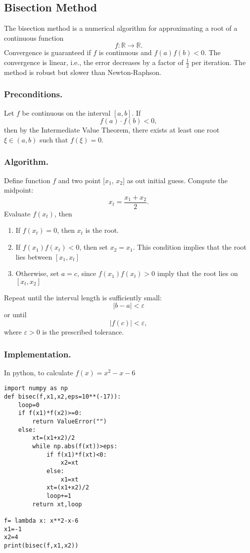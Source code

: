 \documentclass[../../../main.tex]{subfiles}
\begin{document}
\subsection{Bisection Method}

The bisection method is a numerical algorithm for approximating a root of a continuous function
\[
    f : \mathbb{R} \to \mathbb{R}.
\]
Convergence is guaranteed if $f$ is continuous and $f(a)f(b)<0$.
The convergence is linear, i.e., the error decreases by a factor of $\tfrac{1}{2}$ per iteration.
The method is robust but slower than Newton-Raphson.

\subsubsection{Preconditions.}
Let $f$ be continuous on the interval $[a,b]$.
If
\[
    f(a) \cdot f(b) < 0,
\]
then by the Intermediate Value Theorem, there exists at least one root $\xi \in (a,b)$ such that $f(\xi) = 0$.

\subsubsection{Algorithm.}
Define function $f$ and two point $[x_1$, $x_2]$ as out initial guess.
Compute the midpoint:
\[
    x_t= \frac{x_1+x_2}{2}.
\]
Evaluate $f(x_t)$, then
\begin{enumerate}
    \item If $f(x_t) = 0$, then $x_t$ is the root.
    \item If $f(x_1) f(x_t) < 0$, then set $x_2 = x_1$. This condition implies that the root lies between $[x_1,x_t]$
    \item Otherwise, set $a = c$, since $f(x_1)f(x_t)>0$ imply that the root lies on $[x_t,x_2]$
\end{enumerate}
Repeat until the interval length is sufficiently small:
\[
    |b-a| < \varepsilon
\]
or until
\[
    |f(c)| < \varepsilon,
\]
where $\varepsilon > 0$ is the prescribed tolerance.

\subsubsection{Implementation.}
In python, to calculate $f(x)=x^2-x-6$
\begin{verbatim}
import numpy as np
def bisec(f,x1,x2,eps=10**(-17)):
    loop=0
    if f(x1)*f(x2)>=0:
        return ValueError("")
    else:
        xt=(x1+x2)/2
        while np.abs(f(xt))>eps:
            if f(x1)*f(xt)<0:
                x2=xt 
            else:
                x1=xt 
            xt=(x1+x2)/2
            loop+=1
        return xt,loop

f= lambda x: x**2-x-6
x1=-1
x2=4
print(bisec(f,x1,x2))
\end{verbatim}
\end{document}
